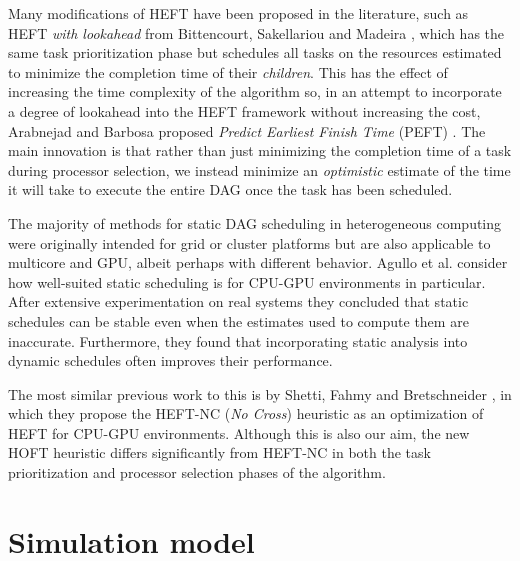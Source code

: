 \documentclass[runningheads]{llncs}
\begin{document}
Many modifications of HEFT have been proposed in the literature, such as HEFT {\em with lookahead} from Bittencourt, Sakellariou and Madeira \cite{bittencourt10}, which has the same task prioritization phase but schedules all tasks on the resources estimated to minimize the completion time of their {\em children}. This has the effect of increasing the time complexity of the algorithm so, in an attempt to incorporate a degree of lookahead into the HEFT framework without increasing the cost, Arabnejad and Barbosa proposed {\em Predict Earliest Finish Time} (PEFT) \cite{arabnejad14}. The main innovation is that rather than just minimizing the completion time of a task during processor selection, we instead minimize an {\em optimistic} estimate of the time it will take to execute the entire DAG once the task has been scheduled.

The majority of methods for static DAG scheduling in heterogeneous computing were originally intended for grid or cluster platforms but are also applicable to multicore and GPU, albeit perhaps with different behavior. Agullo et al. \cite{agullo2016} consider how well-suited static scheduling is for CPU-GPU environments in particular. After extensive experimentation on real systems they concluded that static schedules can be stable even when the estimates used to compute them are inaccurate. Furthermore, they found that incorporating static analysis into dynamic schedules often improves their performance. 

The most similar previous work to this is by Shetti, Fahmy and Bretschneider \cite{shetti2013optimization}, in which they propose the HEFT-NC ({\em No Cross}) heuristic as an optimization of HEFT for CPU-GPU environments. Although this is also our aim, the new HOFT heuristic differs significantly from HEFT-NC in both the task prioritization and processor selection phases of the algorithm. 



\section{Simulation model}
\label{sect.simulator}
\end{document}
